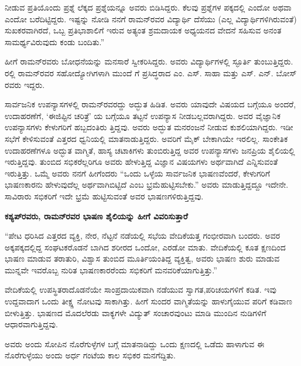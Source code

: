 \noindent
ನೀಡುವ ಪ್ರತಿಯೊಂದು ಪ್ರಶ್ನೆ ಲೆಕ್ಕದ ಪ್ರಶ್ನೆಯನ್ನೂ ಅವರು ಬಿಡಿಸಿದ್ದರು. ಕೆಲವು ಪ್ರಶ್ನೆಗಳ ಪಕ್ಕದಲ್ಲಿ  ಎಂದೋ  ಅಥವಾ  ಎಂದೋ ಬರೆದಿಟ್ಟಿದ್ದರು. ಇಷ್ಟನ್ನು ನೋಡಿ ನನಗೆ ರಾಮನ್‍ರವರ ವಿದ್ಯಾರ್ಥಿ ದೆಸೆಯು (ಎಲ್ಲ ವಿದ್ಯಾರ್ಥಿಗಳಿಗಿರುವಂತೆ) ಸುಖಕರವಾಗಿರದೆ, ಒಬ್ಬ ಪ್ರತಿಭಾಶಾಲಿಗೆ ಇರುವ ಅತ್ಯಂತ ಶ್ರಮದಾಯಕ ಅಧ್ಯಯನದ ವೇದನೆ ಸಹಿಸುವ ಅನಂತ ಸಾಮರ್ಥ್ಯವಿರುವುದು ಕಂಡು ಬಂದಿತು.”


ಹೀಗೆ ರಾಮನ್‍ರವರು ಬೋಧನೆಯನ್ನು ಮನಸಾರೆ ಸ್ವೀಕರಿಸಿದ್ದರು. ಅವರು ವಿದ್ಯಾರ್ಥಿಗಳಲ್ಲಿ ಸ್ಫೂರ್ತಿ ತುಂಬುತ್ತಿದ್ದರು. ರಲ್ಲಿ ರಾಮನ್‍ರವರ ಸಹೋದ್ಯೋಗಿಗಳಾಗಿ ಮುಂದೆ  ಗೆ ಪ್ರಸಿದ್ಧರಾದ ಎಂ. ಎಸ್. ಸಾಹಾ ಮತ್ತು ಎಸ್. ಎನ್. ಬೋಸ್ ರವರು ಇದ್ದರು.


ಸಾರ್ವಜನಿಕ ಉಪನ್ಯಾಸಗಳಲ್ಲಿ ರಾಮನ್‍ರವರದ್ದು ಅದ್ಭುತ ಹಿಡಿತ. ಅವರು ಯಾವುದೇ ವಿಷಯದ ಬಗ್ಗೆಯೂ ಅಂದರೆ, ಉದಾಹರಣೆಗೆ, ‘ಈಜಿಪ್ಟಿನ ಚರಿತ್ರೆ’ ಯ ಬಗ್ಗೆಯೂ ತಟ್ಟನೆ ಉಪನ್ಯಾಸ ನೀಡಬಲ್ಲವರಾಗಿದ್ದರು. ಅವರ ವೈಜ್ಞಾನಿಕ ಉಪನ್ಯಾಸಗಳು ಕೇಳುಗರಿಗೆ ಹಬ್ಬದಂತಿರು\- ತ್ತಿದ್ದವು. ಅವರು ಅದ್ಭುತ ಮನರಂಜನೆ ನೀಡುವ ಕುಶಲಿಯಾಗಿದ್ದರು. ಇಡೀ ಸಭೆಗೆ ಕೇಳಿಸುವಂತೆ ಎತ್ತರದ ಧ್ವನಿಯಲ್ಲಿ ಮಾತನಾಡುತ್ತಿದ್ದರು. ಅವರಿಗೆ ಮೈಕ್ ಬೇಕಾಗಿಯೇ ಇರಲಿಲ್ಲ. ಸಾಂಕೇತಿಕ  ಉದಾಹರಣೆಗಳೂ ಅದ್ಭುತ ವಾಗ್ಮಿತೆ, ಹಾಸ್ಯ ಚಟಾಕಿಗಳು ತುಂಬಿರುತ್ತಿದ್ದ ಅವರ ಉಪನ್ಯಾಸಗಳು ಜನಪ್ರಿಯ ಶೈಲಿಯಲ್ಲಿ ಇರುತ್ತಿದ್ದವು. ತುಂಬಿದ ಸಭಿಕರೆಲ್ಲರಿಗೂ ಅವರು ಹೇಳುತ್ತಿದ್ದ ವಿಜ್ಞಾನ ವಿಷಯಗಳು ಅರ್ಥವಾಗಿದೆ ಎನ್ನಿಸುವಂತೆ ಇರುತ್ತಿತ್ತು. ಒಮ್ಮೆ ಅವರು ನನಗೆ ಹೀಗೆಂದರು “ಒಂದು ಒಳ್ಳೆಯ ಸಾರ್ವಜನಿಕ ಭಾಷಣವೆಂದರೆ, ಕೇಳುಗರಿಗೆ ಭಾಷಣಕಾರನು ಹೇಳುವುದೆಲ್ಲ ಅರ್ಥವಾಗಿಬಿಟ್ಟಿದೆ ಎಂಬ ಭ್ರಮೆಹುಟ್ಟಿಸಬೇಕು.” ಅವರು ಮಾಡುತ್ತಿದ್ದದ್ದೂ ಇದೇನೇ. ಸಾವಿರಾರು ಸಭಿಕರಿಗೆ ಇದೇ ಭ್ರಮೆ ಹುಟ್ಟಿಸುವಂತೆ ಅವರ ಭಾಷಣಗಳಿರುತ್ತಿದ್ದವು.

\vskip 2pt

\textbf{ಕಶ್ಯಪ್‍ರವರು, ರಾಮನ್‍ರವರ ಭಾಷಣ ಶೈಲಿಯನ್ನು ಹೀಗೆ ವಿವರಿಸುತ್ತಾರೆ\general{\enginline{--}}}

\vskip 2pt

“ಪೇಟ ಧರಿಸಿದ ಎತ್ತರದ ವ್ಯಕ್ತಿ, ನೇರ, ನೆಟ್ಟನೆ ನಡೆಯಲ್ಲಿ ಸಭೆಯ ವೇದಿಕೆಯತ್ತ ಗಂಭೀರವಾಗಿ ಬಂದರು. ಅವರ ಅಕ್ಕಪಕ್ಕದಲ್ಲಿದ್ದ ಸಂಘಟಕರೊಡನೆ ಬಾಗಿದ ಶರೀರದ ಒಂದೋ, ಎರಡೋ ಮಾತು. ವೇದಿಕೆಯಲ್ಲಿ ಕೂತ ಕ್ಷಣದಿಂದ ಭಾಷಣ ಮಾಡುವ ತರಾತುರಿ, ವಿಶ್ವಾಸ ತುಂಬಿದ ಮೂರ್ತಿಯಂತಿದ್ದ ವ್ಯಕ್ತಿತ್ವ, ಅವರು ಭಾಷಣ ಶುರು ಮಾಡುವ ಮುನ್ನವೇ ಇವರೊಬ್ಬ ನುರಿತ ಭಾಷಣಕಾರರೆಂದು ಸಭಿಕರಿಗೆ ಮನವರಿಕೆಯಾಗುತ್ತಿತ್ತು.”

ವೇದಿಕೆಯಲ್ಲಿ ಉಪಸ್ಥಿತರಾದೊಡನೆಯೇ ಸಾಂಪ್ರದಾಯಿಕವಾಗಿ ನಡೆಯುವ ಸ್ವಾಗತ,\break ಪರಿಚಯಗಳಿಗೆ ಕಡಿತ. ಇವು ಉದ್ದವಾದಾಗ ಒಂದು ತೀಕ್ಷ್ಣ ನೋಟವು ಸಾಕಾಗಿತ್ತು. ಹೀಗೆ ಸುಂದರ ವಾಗ್ಮಿತೆಯನ್ನು ಹಾಳುಗೈಯುವ ಪರಿಗೆ ಕಡಿವಾಣ ಬೀಳುತ್ತಿತ್ತು. ಭಾಷಣದ ಮೊದಲೆರಡು ವಾಕ್ಯಗಳೇ ವಿದ್ಯುತ್ ಸಂಚಾರವುಂಟು ಮಾಡಿ ಮುಂದಿನ ನುಡಿಗಳಿಗೆ ಆಧಾರವಾಗುತ್ತಿದ್ದವು.

ಅವರು ಅಂದು ಸೋಪಿನ ನೊರೆಗುಳ್ಳೆಗಳ ಬಗ್ಗೆ ಮಾತನಾಡಿದ್ದು ಒಂದು ಕ್ಷಣದಲ್ಲಿ ಒಡೆದು ಹಾಳಾಗುವ ಈ ನೊರೆಗುಳ್ಳೆಯು ಅಂದು ಅರ್ಧ ಗಂಟೆಯ ಕಾಲ ಸಭಿಕರ ಮನಗೆದ್ದಿತು.

